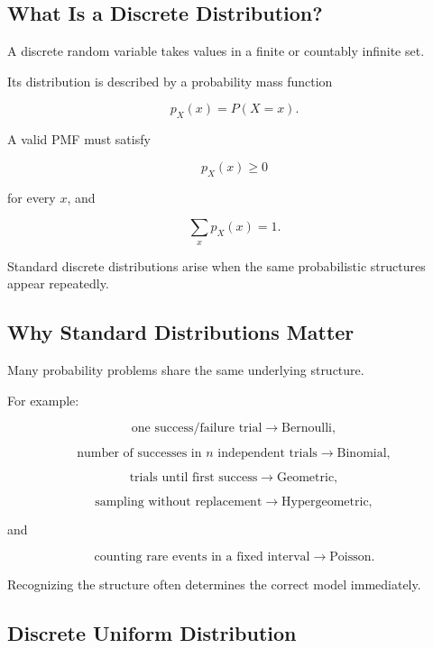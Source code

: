 \subsection{What Is a Discrete Distribution?}
\label{subsec:what-is-discrete-distribution}

A discrete random variable takes values in a finite or countably
infinite set.

Its distribution is described by a probability mass function

\[
\boxed{
p_X(x)=P(X=x).
}
\]

A valid PMF must satisfy

\[
\boxed{
p_X(x)\geq0
}
\]

for every \(x\), and

\[
\boxed{
\sum_x p_X(x)=1.
}
\]

Standard discrete distributions arise when the same probabilistic
structures appear repeatedly.

\subsection{Why Standard Distributions Matter}
\label{subsec:why-standard-discrete-distributions}

Many probability problems share the same underlying structure.

For example:

\[
\boxed{
\text{one success/failure trial}
\longrightarrow
\text{Bernoulli},
}
\]

\[
\boxed{
\text{number of successes in \(n\) independent trials}
\longrightarrow
\text{Binomial},
}
\]

\[
\boxed{
\text{trials until first success}
\longrightarrow
\text{Geometric},
}
\]

\[
\boxed{
\text{sampling without replacement}
\longrightarrow
\text{Hypergeometric},
}
\]

and

\[
\boxed{
\text{counting rare events in a fixed interval}
\longrightarrow
\text{Poisson}.
}
\]

Recognizing the structure often determines the correct model immediately.

\subsection{Discrete Uniform Distribution}
\label{subsec:discrete-uniform-distribution}

